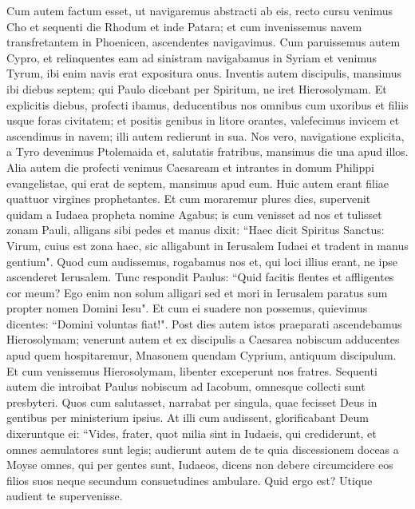 \begin{biblechapter}  
\verse Cum autem factum esset, ut navigaremus abstracti ab eis, recto cursu venimus Cho et sequenti die Rhodum et inde Patara; 
\verse et cum invenissemus navem transfretantem in Phoenicen, ascendentes navigavimus. 
\verse Cum paruissemus autem Cypro, et relinquentes eam ad sinistram navigabamus in Syriam et venimus Tyrum, ibi enim navis erat expositura onus. 
\verse Inventis autem discipulis, mansimus ibi diebus septem; qui Paulo dicebant per Spiritum, ne iret Hierosolymam. 
\verse Et explicitis diebus, profecti ibamus, deducentibus nos omnibus cum uxoribus et filiis usque foras civitatem; et positis genibus in litore orantes, 
\verse valefecimus invicem et ascendimus in navem; illi autem redierunt in sua. 
\verse Nos vero, navigatione explicita, a Tyro devenimus Ptolemaida et, salutatis fratribus, mansimus die una apud illos. 
\verse Alia autem die profecti venimus Caesaream et intrantes in domum Philippi evangelistae, qui erat de septem, mansimus apud eum. 
\verse Huic autem erant filiae quattuor virgines prophetantes. 
\verse Et cum moraremur plures dies, supervenit quidam a Iudaea propheta nomine Agabus; 
\verse is cum venisset ad nos et tulisset zonam Pauli, alligans sibi pedes et manus dixit: “Haec dicit Spiritus Sanctus: Virum, cuius est zona haec, sic alligabunt in Ierusalem Iudaei et tradent in manus gentium". 
\verse Quod cum audissemus, rogabamus nos et, qui loci illius erant, ne ipse ascenderet Ierusalem. 
\verse Tunc respondit Paulus: “Quid facitis flentes et affligentes cor meum? Ego enim non solum alligari sed et mori in Ierusalem paratus sum propter nomen Domini Iesu". 
\verse Et cum ei suadere non possemus, quievimus dicentes: “Domini voluntas fiat!". 
\verse Post dies autem istos praeparati ascendebamus Hierosolymam; 
\verse venerunt autem et ex discipulis a Caesarea nobiscum adducentes apud quem hospitaremur, Mnasonem quendam Cyprium, antiquum discipulum. 
\verse Et cum venissemus Hierosolymam, libenter exceperunt nos fratres. 
\verse Sequenti autem die introibat Paulus nobiscum ad Iacobum, omnesque collecti sunt presbyteri. 
\verse Quos cum salutasset, narrabat per singula, quae fecisset Deus in gentibus per ministerium ipsius. 
\verse At illi cum audissent, glorificabant Deum dixeruntque ei: “Vides, frater, quot milia sint in Iudaeis, qui crediderunt, et omnes aemulatores sunt legis; 
\verse audierunt autem de te quia discessionem doceas a Moyse omnes, qui per gentes sunt, Iudaeos, dicens non debere circumcidere eos filios suos neque secundum consuetudines ambulare.  
\verse Quid ergo est? Utique audient te supervenisse. 

\end{biblechapter}
